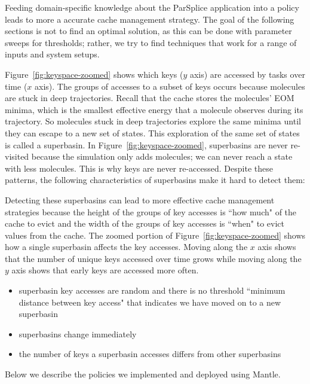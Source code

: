 Feeding domain-specific knowledge about the ParSplice application into a policy
leads to more a accurate cache management strategy.  The goal of the following
sections is not to find an optimal solution, as this can be done with parameter
sweeps for thresholds; rather, we try to find techniques that work for a range
of inputs and system setups.

Figure~\ref{fig:keyspace-zoomed} shows which keys (\(y\) axis) are accessed by
tasks over time (\(x\) axis). The groups of accesses to a subset of keys occurs
because molecules are stuck in deep trajectories. Recall that the cache stores
the molecules' EOM minima, which is the smallest effective energy that a
molecule observes during its trajectory. So molecules stuck in deep
trajectories explore the same minima until they can escape to a new set of
states. This exploration of the same set of states is called a superbasin.  In
Figure~\ref{fig:keyspace-zoomed}, superbasins are never re-visited because the
simulation only adds molecules; we can never reach a state with less molecules.
This is why keys are never re-accessed.  Despite these patterns, the following
characteristics of superbasins make it hard to detect them:

Detecting these superbasins can lead to more effective cache management
strategies because the height of the groups of key accesses is ``how much" of
the cache to evict and the width of the groups of key accesses is ``when" to
evict values from the cache.  The zoomed portion of
Figure~\ref{fig:keyspace-zoomed} shows how a single superbasin affects the key
accesses. Moving along the \(x\) axis shows that the number of unique keys
accessed over time grows while moving along the \(y\) axis shows that early
keys are accessed more often.

\begin{itemize}

  \item superbasin key accesses are random and there is no threshold ``minimum distance
  between key access" that indicates we have moved on to a new superbasin

  \item superbasins change immediately

  \item the number of keys a superbasin accesses differs from other superbasins

\end{itemize}

Below we describe the policies we implemented and deployed using Mantle.


